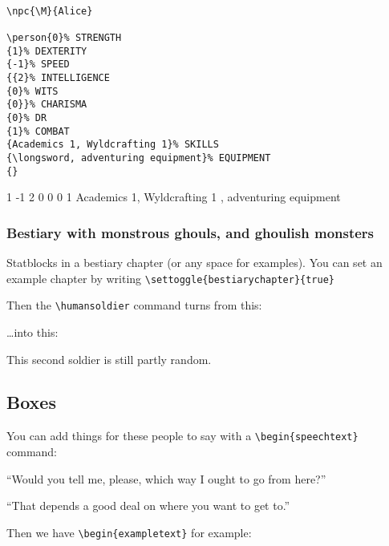 \documentclass[a4paper,openany]{book}
\begin{document}
\begin{multicols}{2}
\begin{verbatim}

\npc{\M}{Alice}

\person{0}% STRENGTH
{1}% DEXTERITY 
{-1}% SPEED
{{2}% INTELLIGENCE
{0}% WITS
{0}}% CHARISMA
{0}% DR
{1}% COMBAT
{Academics 1, Wyldcrafting 1}% SKILLS
{\longsword, adventuring equipment}% EQUIPMENT
{}

\end{verbatim}


{1}%
{-1}%
{{2}%
{0}%
{0}}%
{0}%
{1}%
{Academics 1, Wyldcrafting 1}%
{\longsword, adventuring equipment}%
{}

\subsubsection{Bestiary with monstrous ghouls, and ghoulish monsters}

Statblocks in a bestiary chapter (or any space for examples).
You can set an example chapter by writing \verb"\settoggle{bestiarychapter}{true}"

Then the \verb"\humansoldier" command turns from this:

\humansoldier

\ldots into this:


\humansoldier

This second soldier is still partly random.

\subsection{Boxes}

You can add things for these people to say with a \verb"\begin{speechtext}" command:

\begin{speechtext}

  ``Would you tell me, please, which way I ought to go from here?''

  ``That depends a good deal on where you want to get to.''

\end{speechtext}

Then we have \verb"\begin{exampletext}" for example:


\end{multicols}
\end{document}
